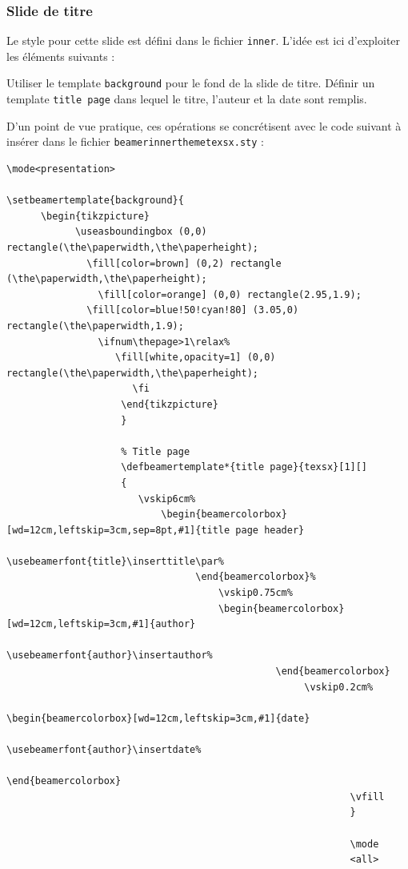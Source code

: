 \subsubsection{Slide de titre}
Le style pour cette slide est défini dans le fichier \texttt{inner}. L'idée est ici d'exploiter les éléments suivants :\begin{itemize}
	\itemperso{}Utiliser le template \texttt{background} pour le fond de la slide de titre.
	\itemperso{}Définir un template \texttt{title page} dans lequel le titre, l'auteur et la date sont remplis.
\end{itemize}
D'un point de vue pratique, ces opérations se concrétisent avec le code suivant à insérer dans le fichier \texttt{beamerinnerthemetexsx.sty} :

\begin{lstlisting}[language={[LaTeX]TeX}]
\mode<presentation>

\setbeamertemplate{background}{
	  \begin{tikzpicture}
		    \useasboundingbox (0,0) rectangle(\the\paperwidth,\the\paperheight);
		      \fill[color=brown] (0,2) rectangle (\the\paperwidth,\the\paperheight);
		        \fill[color=orange] (0,0) rectangle(2.95,1.9);
			  \fill[color=blue!50!cyan!80] (3.05,0) rectangle(\the\paperwidth,1.9);
			    \ifnum\thepage>1\relax%
			       \fill[white,opacity=1] (0,0) rectangle(\the\paperwidth,\the\paperheight);
			          \fi
				    \end{tikzpicture}
				    }

				    % Title page
				    \defbeamertemplate*{title page}{texsx}[1][]
				    { 
				       \vskip6cm%
				           \begin{beamercolorbox}[wd=12cm,leftskip=3cm,sep=8pt,#1]{title page header}
						         \usebeamerfont{title}\inserttitle\par%
							     \end{beamercolorbox}%
							         \vskip0.75cm%
								     \begin{beamercolorbox}[wd=12cm,leftskip=3cm,#1]{author}
									           \usebeamerfont{author}\insertauthor%
										       \end{beamercolorbox}
										            \vskip0.2cm%
											        \begin{beamercolorbox}[wd=12cm,leftskip=3cm,#1]{date}
													      \usebeamerfont{author}\insertdate%
													          \end{beamercolorbox}
														    \vfill
														    }

														    \mode
														    <all>
\end{lstlisting}

